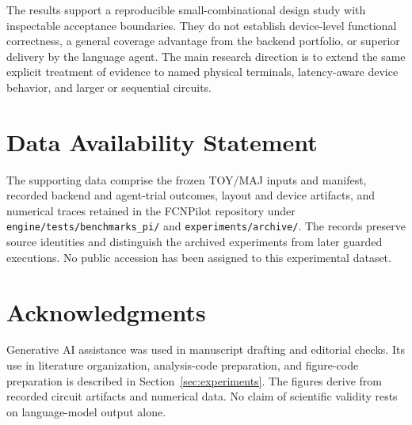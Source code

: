 \documentclass[ASNA,twocolumn]{USG}
\begin{document}
The results support a reproducible small-combinational design study with inspectable acceptance boundaries. They do not establish device-level functional correctness, a general coverage advantage from the backend portfolio, or superior delivery by the language agent. The main research direction is to extend the same explicit treatment of evidence to named physical terminals, latency-aware device behavior, and larger or sequential circuits.

\section*{Data Availability Statement}
The supporting data comprise the frozen TOY/MAJ inputs and manifest, recorded backend and agent-trial outcomes, layout and device artifacts, and numerical traces retained in the FCNPilot repository under \texttt{engine/tests/benchmarks\_pi/} and \texttt{experiments/archive/}. The records preserve source identities and distinguish the archived experiments from later guarded executions. No public accession has been assigned to this experimental dataset.

\section*{Acknowledgments}
Generative AI assistance was used in manuscript drafting and editorial checks. Its use in literature organization, analysis-code preparation, and figure-code preparation is described in Section~\ref{sec:experiments}. The figures derive from recorded circuit artifacts and numerical data. No claim of scientific validity rests on language-model output alone.


\end{document}
